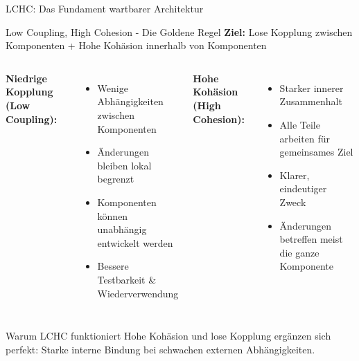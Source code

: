 \begin{frame}{LCHC: Das Fundament wartbarer Architektur}
  \begin{exampleblock}{Low Coupling, High Cohesion - Die Goldene Regel}
    \textbf{Ziel:} Lose Kopplung zwischen Komponenten + Hohe Kohäsion innerhalb von Komponenten
  \end{exampleblock}

  \begin{columns}[T]
    \textbf{Niedrige Kopplung (Low Coupling):}
    \begin{itemize}
      \item Wenige Abhängigkeiten zwischen Komponenten
      \item Änderungen bleiben lokal begrenzt
      \item Komponenten können unabhängig entwickelt werden
      \item Bessere Testbarkeit \& Wiederverwendung
    \end{itemize}

    \textbf{Hohe Kohäsion (High Cohesion):}
    \begin{itemize}
      \item Starker innerer Zusammenhalt
      \item Alle Teile arbeiten für gemeinsames Ziel
      \item Klarer, eindeutiger Zweck
      \item Änderungen betreffen meist die ganze Komponente
    \end{itemize}
  \end{columns}

  \begin{alertblock}{Warum LCHC funktioniert}
    Hohe Kohäsion und lose Kopplung ergänzen sich perfekt: Starke interne Bindung bei schwachen externen Abhängigkeiten.
  \end{alertblock}
\end{frame}

